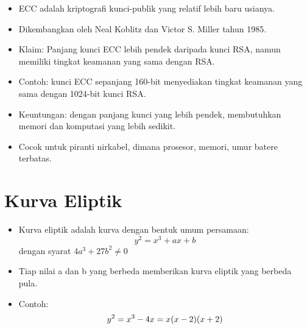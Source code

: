 \documentclass{article}
\begin{document}
\vfill
{}

\newpage


\begin{itemize}
  \item ECC adalah kriptografi kunci-publik yang relatif lebih baru usianya.
  \item Dikembangkan oleh Neal Koblitz dan Victor S. Miller tahun 1985.
  \item Klaim: Panjang kunci ECC lebih pendek daripada kunci RSA, namun memiliki tingkat keamanan yang sama dengan RSA.
  \item Contoh: kunci ECC sepanjang 160-bit menyediakan tingkat keamanan yang sama dengan 1024-bit kunci RSA.
  \item Keuntungan: dengan panjang kunci yang lebih pendek, membutuhkan memori dan komputasi yang lebih sedikit.
  \item Cocok untuk piranti nirkabel, dimana prosesor, memori, umur batere terbatas.
\end{itemize}

\newpage


\section*{Kurva Eliptik}

\begin{itemize}
    \item Kurva eliptik adalah kurva dengan bentuk umum persamaan:
    \[ y^2 = x^3 + ax + b \]
    dengan syarat $4a^3 + 27b^2 \neq 0$
    \item Tiap nilai a dan b yang berbeda memberikan kurva eliptik yang berbeda pula.
\end{itemize}

\newpage


\begin{itemize}
  \item Contoh: \[ y^2 = x^3 - 4x \\ = x(x-2)(x+2) \]
\end{itemize}

\vspace{80mm}
\end{document}
